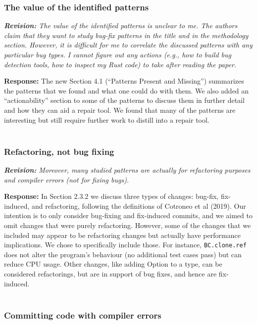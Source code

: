 \documentclass{article}
\begin{document}
\subsubsection{\label{rev:2:value}The value of the identified patterns}

\textit{\textbf{Revision:} The value of the identified patterns is unclear to me. The authors claim that they want to study bug-fix patterns in the title and in the methodology section. However, it is difficult for me to correlate the discussed patterns with any particular bug types. I cannot figure out any actions (e.g., how to build bug detection tools, how to inspect my Rust code) to take after reading the paper.}

\textbf{Response:} The new Section 4.1 (“Patterns Present and Missing”) summarizes the patterns that we found and what one could do with them. We also added an “actionability” section to some of the patterns to discuss them in further detail and how they can aid a repair tool. We found that many of the patterns are interesting but still require further work to distill into a repair tool. \\ \\

\subsubsection{\label{rev:2:refactoring}Refactoring, not bug fixing}

\textit{\textbf{Revision:} Moreover, many studied patterns are actually for refactoring purposes and compiler errors (not for fixing bugs).}

\textbf{Response:} In Section 2.3.2 we discuss three types of changes: bug-fix, fix-induced, and refactoring, following the definitions of Cotroneo et al (2019). Our intention is to only consider bug-fixing and fix-induced commits, and we aimed to omit changes that were purely refactoring. However, some of the changes that we included may appear to be refactoring changes but actually have performance implications. We chose to specifically include those. For instance, \verb+BC.clone.ref+ does not alter the program's behaviour (no additional test cases pass) but can reduce CPU usage. Other changes, like adding Option to a type, can be considered refactorings, but are in support of bug fixes, and hence are fix-induced. \\ \\

\subsubsection{\label{rev:2:compile}Committing code with compiler errors}
\end{document}
